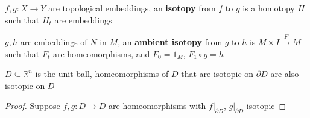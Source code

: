\documentclass[main]{subfiles}
\begin{document}
\begin{definition}
$f,g:X\to Y$ are topological embeddings, an \textbf{isotopy} from $f$ to $g$ is a homotopy $H$ such that $H_t$ are embeddings
\end{definition}

\begin{definition}
$g,h$ are embeddings of $N$ in $M$, an \textbf{ambient isotopy} from $g$ to $h$ is $M\times I\xrightarrow FM$ such that $F_t$ are homeomorphisms, and $F_0=1_M$, $F_1\circ g=h$
\end{definition}

\begin{theorem}
$D\subseteq\mathbb R^n$ is the unit ball, homeomorphisms of $D$ that are isotopic on $\partial D$ are also isotopic on $D$
\end{theorem}

\begin{proof}
Suppose $f,g:D\to D$ are homeomorphisms with $f|_{\partial D}$, $g|_{\partial D}$ isotopic
\end{proof}
\end{document}
